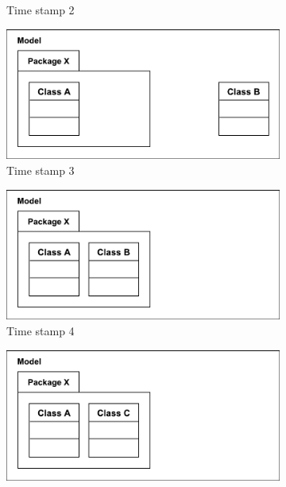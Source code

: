 \documentclass{llncs}
\begin{document}
\begin{figure}[t]
\begin{subfigure}[t]{0.245\linewidth}
        \caption{Time stamp 2}
        \label{fig:illustration_3}
    \end{subfigure}
    \begin{subfigure}[t]{0.245\linewidth}
        \centering
        \includegraphics[width=\linewidth]{images/illustration_4}
        \caption{Time stamp 3}
        \label{fig:illustration_4}
    \end{subfigure}
    \hfill
    \begin{subfigure}[t]{0.245\linewidth}
        \centering
        \includegraphics[width=\linewidth]{images/illustration_5}
        \caption{Time stamp 4}
        \label{fig:illustration_5}
    \end{subfigure}
    \begin{subfigure}[t]{0.245\linewidth}
        \centering
        \includegraphics[width=\linewidth]{images/illustration_6}

\end{subfigure}
\end{figure}
\end{document}
